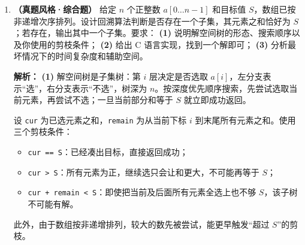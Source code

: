 \begin{enumerate}[resume]
\textbf{(2)} 实现如下：
\begin{lstlisting}[language=C]
int MaxCrossing(int A[], int lo, int mid, int hi) {
    int sum = 0, leftMax = A[mid];
    for (int i = mid; i >= lo; --i) {   // 从 mid 向左扫描
        sum += A[i];
        if (sum > leftMax) leftMax = sum;
    }
    sum = 0;
    int rightMax = A[mid + 1];
    for (int j = mid + 1; j <= hi; ++j) { // 从 mid+1 向右扫描
        sum += A[j];
        if (sum > rightMax) rightMax = sum;
    }
    return leftMax + rightMax;
}

int MaxSubArray(int A[], int lo, int hi) {
    if (lo == hi) return A[lo];         // 只有一个元素
    int mid = lo + (hi - lo) / 2;
    int lmax = MaxSubArray(A, lo, mid);
    int rmax = MaxSubArray(A, mid + 1, hi);
    int cmax = MaxCrossing(A, lo, mid, hi);
    int best = (lmax > rmax) ? lmax : rmax;
    return (cmax > best) ? cmax : best;
}
\end{lstlisting}
调用 \texttt{MaxSubArray(A, 0, n-1)} 即可。基例取单个元素，因此全为负数时也能正确返回最大的那个负数，不会把空段的和 $0$ 误当成答案。

\textbf{(3)} 设处理长度为 $n$ 的区间所需时间为 $T(n)$。两次递归各处理约 $n/2$ 的规模，跨中点扫描以及常数次比较为 $\Theta(n)$，故
\[
T(n)=2T\!\left(\frac n2\right)+\Theta(n),\qquad T(1)=\Theta(1).
\]
由主定理，$a=2$、$b=2$、$\log_b a=1$，且 $f(n)=\Theta(n)$，属于第二种情形，因此
\[
T(n)=\Theta(n\log n).
\]
递归深度为 $O(\log n)$，每层只保存常数个局部变量，故递归栈空间为 $O(\log n)$；除输入数组外不需要额外的 $O(n)$ 辅助数组。\else \answerarea[14] \fi

\item \textbf{（真题风格·综合题）} 给定 $n$ 个正整数 $a[0\ldots n-1]$ 和目标值 $S$，数组已按非递增次序排列。设计回溯算法判断是否存在一个子集，其元素之和恰好为 $S$；若存在，输出其中一个子集。要求：
\textbf{(1)} 说明解空间树的形态、搜索顺序以及你使用的剪枝条件；
\textbf{(2)} 给出 C 语言实现，找到一个解即可；
\textbf{(3)} 分析最坏情况下的时间复杂度和辅助空间。

\ifshowsolutions\par\noindent\textbf{解析：} \textbf{(1)} 解空间树是子集树：第 $i$ 层决定是否选取 $a[i]$，左分支表示“选”，右分支表示“不选”，树深为 $n$。按深度优先顺序搜索，先尝试选取当前元素，再尝试不选；一旦当前部分和等于 $S$ 就立即成功返回。

设 \texttt{cur} 为已选元素之和，\texttt{remain} 为从当前下标 $i$ 到末尾所有元素之和。使用三个剪枝条件：
\begin{itemize}
\item \texttt{cur == S}：已经凑出目标，直接返回成功；
\item \texttt{cur > S}：所有元素为正，继续选只会让和更大，不可能再等于 $S$；
\item \texttt{cur + remain < S}：即使把当前及后面所有元素全选上也不够 $S$，该子树不可能有解。
\end{itemize}
此外，由于数组按非递增排列，较大的数先被尝试，能更早触发“超过 $S$”的剪枝。


\end{enumerate}
